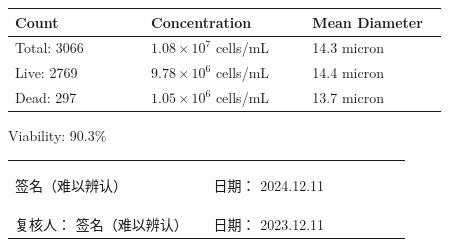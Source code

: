 \documentclass[UTF8,10pt,a4paper,fontset=fandol]{ctexart}
\newcommand{\fieldvalue}[1]{#1}
\newcommand{\handwritten}[1]{#1}
\begin{document}
\noindent
\begin{tabular}{@{}p{0.27\linewidth}p{0.32\linewidth}p{0.27\linewidth}@{}}
\textbf{Count} & \textbf{Concentration} & \textbf{Mean Diameter} \\ \hline
Total:
\fieldvalue{3066}
&
\fieldvalue{$1.08\times10^{7}$ cells/mL}
&
\fieldvalue{14.3 micron}
\\
Live:
\fieldvalue{2769}
&
\fieldvalue{$9.78\times10^{6}$ cells/mL}
&
\fieldvalue{14.4 micron}
\\
Dead:
\fieldvalue{297}
&
\fieldvalue{$1.05\times10^{6}$ cells/mL}
&
\fieldvalue{13.7 micron}
\end{tabular}

\medskip

Viability:
\fieldvalue{90.3\%}

\bigskip

\noindent
\begin{tabular}{@{}p{0.47\linewidth}p{0.47\linewidth}@{}}
\begin{center}
\fieldvalue{\handwritten{签名（难以辨认）}}
\end{center}
&
\begin{center}
日期：
\fieldvalue{\handwritten{2024.12.11}}
\end{center}
\\[8pt]
复核人：
\fieldvalue{\handwritten{签名（难以辨认）}}
&
日期：
\fieldvalue{\handwritten{2023.12.11}}
\end{tabular}
\end{document}
